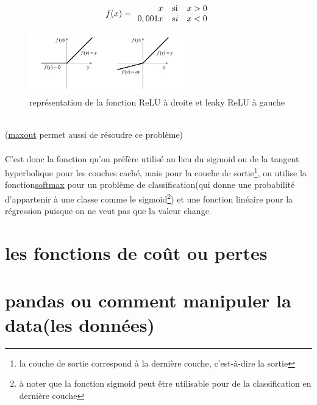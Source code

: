 \documentclass[openany,14pt,fleqn]{book} %
\begin{document}
\[f(x) =\begin{array}{r c l}
      x  &\textrm{si} & x > 0 \\
      0,001x & si & x < 0 \\
   \end{array}\]
\begin{figure}[h]
\centering\includegraphics[width=0.6\textwidth]{Pictures/ReLu.jpeg}
\caption{représentation de la fonction ReLU à droite et leaky ReLU à gauche}
\end{figure}\\
(\underline{maxout} permet aussi de résoudre ce problème) \\ \\

C'est donc la fonction qu'on préfère utilisé au lieu du sigmoid ou de la tangent hyperbolique pour les couches caché, mais pour la couche de sortie\footnote{la couche de sortie correspond à la dernière couche, c'est-à-dire la sortie}, on utilise la fonction\underline{softmax} pour un problème de classification(qui donne une probabilité d'appartenir à une classe comme le sigmoid\footnote{à noter que la fonction sigmoid peut être utilisable pour de la classification en dernière couche}) et une fonction linéaire pour la régression puisque on ne veut pas que la valeur change.


\section{les fonctions de coût ou pertes}
\section{pandas ou comment manipuler la data(les données)}
\end{document}

